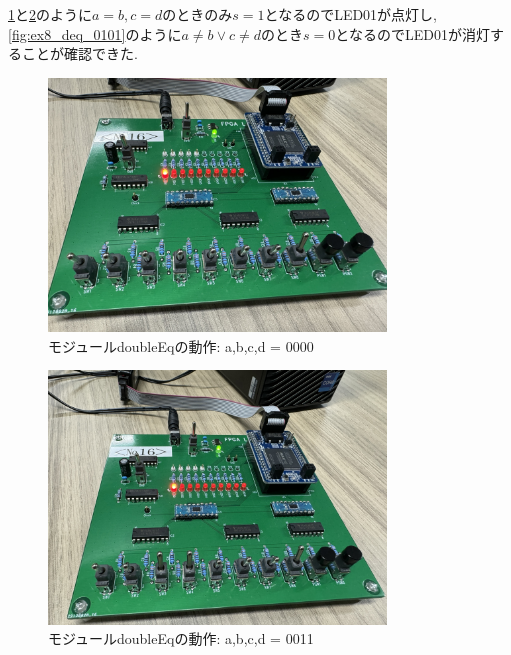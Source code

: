 \documentclass[autodetect-engine, dvi=dvipdfmx, 10pt, a4paper, ja=standard]{bxjsarticle}
\begin{document}
\ref{fig:ex8_deq_0000}と\ref{fig:ex8_deq_0011}のように$a = b, c = d$のときのみ$s = 1$となるのでLED01が点灯し,
\ref{fig:ex8_deq_0101}のように$a \neq b \lor c \neq d$のとき$s = 0$となるのでLED01が消灯することが確認できた.

\begin{figure}[H]
	\centering
	\includegraphics[width=0.8\textwidth]{ex8_deq_0000.jpeg}
	\caption{モジュールdoubleEqの動作: a,b,c,d = 0000}
	\label{fig:ex8_deq_0000}
\end{figure}


\begin{figure}[H]
	\centering
	\includegraphics[width=0.8\textwidth]{ex8_deq_0011.jpeg}
	\caption{モジュールdoubleEqの動作: a,b,c,d = 0011}
	\label{fig:ex8_deq_0011}
\end{figure}
\end{document}
